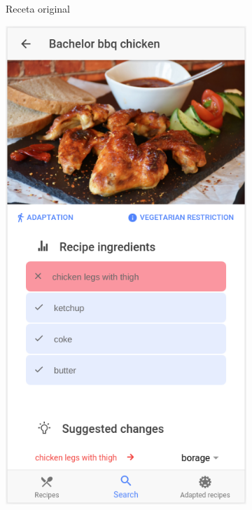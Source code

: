 \begin{figure}[H]
\begin{subfigure}[b]{0.31\linewidth}
        \caption{Receta original}
        \label{fig:ejemplo13}
    \end{subfigure}
    \begin{subfigure}[b]{0.31\linewidth}
        \includegraphics[width=\linewidth]{imagenes/app/pantallas/ejemplo14.png}

\end{subfigure}
\end{figure}

